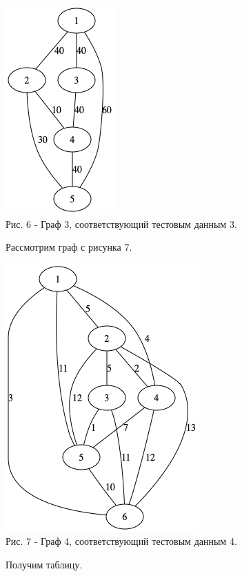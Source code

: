 \documentclass[a4paper,14pt]{article} %
\begin{document}
	\begin{center}
		\includegraphics[scale = 0.8]{graph3} \\ Рис.  6 - Граф 3, соответствующий тестовым данным 3. 
	\end{center}
	
	Рассмотрим граф с рисунка 7. 
	
	\begin{center}
		\includegraphics[scale = 0.8]{graph4} \\ Рис.  7 - Граф 4, соответствующий тестовым данным 4.  
	\end{center}
	
	Получим таблицу. 
	
\end{document}
